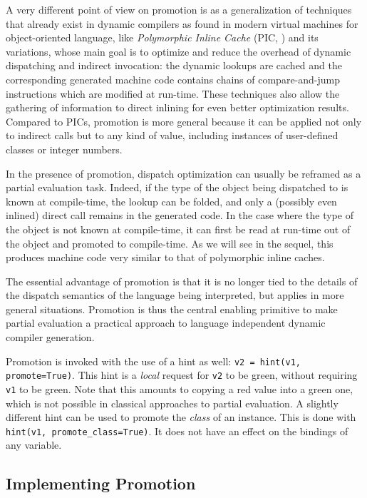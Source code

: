 A very different point of view on promotion is as a generalization of
techniques that already exist in dynamic compilers as found in modern virtual
machines for object-oriented language, like \emph{Polymorphic Inline Cache}
(PIC, \cite{hoelzle_optimizing_1991}) and its variations, whose main goal is
to optimize and reduce the overhead of dynamic dispatching and indirect
invocation: the dynamic lookups are cached and the corresponding generated
machine code contains chains of compare-and-jump instructions which are
modified at run-time.  These techniques also allow the gathering of
information to direct inlining for even better optimization results. Compared
to PICs, promotion is more general because it can be applied not only to
indirect calls but to any kind of value, including instances of user-defined
classes or integer numbers.

In the presence of promotion, dispatch optimization can usually be
reframed as a partial evaluation task.  Indeed, if the type of the
object being dispatched to is known at compile-time, the lookup can be
folded, and only a (possibly even inlined) direct call remains in the
generated code.  In the case where the type of the object is not known
at compile-time, it can first be read at run-time out of the object and
promoted to compile-time.  As we will see in the sequel, this produces
machine code very similar to that of polymorphic inline
caches.

The essential advantage of promotion is that it is no longer tied to the details of
the dispatch semantics of the language being interpreted, but applies in
more general situations.  Promotion is thus the central enabling
primitive to make partial evaluation a practical approach to language
independent dynamic compiler generation.

Promotion is invoked with the use of a hint as well:
\lstinline{v2 = hint(v1, promote=True)}.
This hint is a \emph{local} request for \texttt{v2} to be green, without
requiring \texttt{v1} to be green.  Note that this amounts to copying
a red value into a green one, which is not possible in classical
approaches to partial evaluation. A slightly different hint can be used to
promote the \emph{class} of an instance. This is done with
\lstinline{hint(v1, promote_class=True)}. It does not have an effect on the
bindings of any variable.


\subsection{Implementing Promotion}

